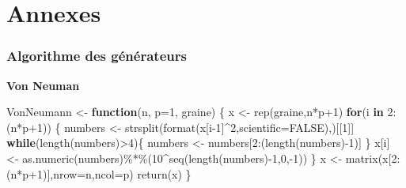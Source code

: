 \documentclass[
]{article}
\newenvironment{Shaded}{\begin{snugshade}}{\end{snugshade}}
\newcommand{\AttributeTok}[1]{\textcolor[rgb]{0.77,0.63,0.00}{#1}}
\newcommand{\ConstantTok}[1]{\textcolor[rgb]{0.00,0.00,0.00}{#1}}
\newcommand{\ControlFlowTok}[1]{\textcolor[rgb]{0.13,0.29,0.53}{\textbf{#1}}}
\newcommand{\DecValTok}[1]{\textcolor[rgb]{0.00,0.00,0.81}{#1}}
\newcommand{\FunctionTok}[1]{\textcolor[rgb]{0.00,0.00,0.00}{#1}}
\newcommand{\NormalTok}[1]{#1}
\newcommand{\OtherTok}[1]{\textcolor[rgb]{0.56,0.35,0.01}{#1}}
\newcommand{\SpecialCharTok}[1]{\textcolor[rgb]{0.00,0.00,0.00}{#1}}
\newcommand{\StringTok}[1]{\textcolor[rgb]{0.31,0.60,0.02}{#1}}
\begin{document}
\part{Annexes}
\label{part:annexes}

\section*{Algorithme des générateurs}

\textbf{Von Neuman}

\begin{Shaded}
\begin{Highlighting}[]
\NormalTok{VonNeumann }\OtherTok{\textless{}{-}} \ControlFlowTok{function}\NormalTok{(n, }\AttributeTok{p=}\DecValTok{1}\NormalTok{, graine)}
\NormalTok{\{}
\NormalTok{  x }\OtherTok{\textless{}{-}}  \FunctionTok{rep}\NormalTok{(graine,n}\SpecialCharTok{*}\NormalTok{p}\SpecialCharTok{+}\DecValTok{1}\NormalTok{)}
  \ControlFlowTok{for}\NormalTok{(i }\ControlFlowTok{in} \DecValTok{2}\SpecialCharTok{:}\NormalTok{(n}\SpecialCharTok{*}\NormalTok{p}\SpecialCharTok{+}\DecValTok{1}\NormalTok{))}
\NormalTok{  \{}
\NormalTok{    numbers }\OtherTok{\textless{}{-}} \FunctionTok{strsplit}\NormalTok{(}\FunctionTok{format}\NormalTok{(x[i}\DecValTok{{-}1}\NormalTok{]}\SpecialCharTok{\^{}}\DecValTok{2}\NormalTok{,}\AttributeTok{scientific=}\ConstantTok{FALSE}\NormalTok{),}\StringTok{\textquotesingle{}\textquotesingle{}}\NormalTok{)[[}\DecValTok{1}\NormalTok{]]}
    \ControlFlowTok{while}\NormalTok{(}\FunctionTok{length}\NormalTok{(numbers)}\SpecialCharTok{\textgreater{}}\DecValTok{4}\NormalTok{)\{ }
\NormalTok{        numbers }\OtherTok{\textless{}{-}}\NormalTok{ numbers[}\DecValTok{2}\SpecialCharTok{:}\NormalTok{(}\FunctionTok{length}\NormalTok{(numbers)}\SpecialCharTok{{-}}\DecValTok{1}\NormalTok{)] }
\NormalTok{    \}}
\NormalTok{    x[i] }\OtherTok{\textless{}{-}} \FunctionTok{as.numeric}\NormalTok{(numbers)}\SpecialCharTok{\%*\%}\NormalTok{(}\DecValTok{10}\SpecialCharTok{\^{}}\FunctionTok{seq}\NormalTok{(}\FunctionTok{length}\NormalTok{(numbers)}\SpecialCharTok{{-}}\DecValTok{1}\NormalTok{,}\DecValTok{0}\NormalTok{,}\SpecialCharTok{{-}}\DecValTok{1}\NormalTok{))}
\NormalTok{  \}}
\NormalTok{  x }\OtherTok{\textless{}{-}} \FunctionTok{matrix}\NormalTok{(x[}\DecValTok{2}\SpecialCharTok{:}\NormalTok{(n}\SpecialCharTok{*}\NormalTok{p}\SpecialCharTok{+}\DecValTok{1}\NormalTok{)],}\AttributeTok{nrow=}\NormalTok{n,}\AttributeTok{ncol=}\NormalTok{p)}
  \FunctionTok{return}\NormalTok{(x)}
\NormalTok{\}}
\end{Highlighting}
\end{Shaded}
\end{document}
